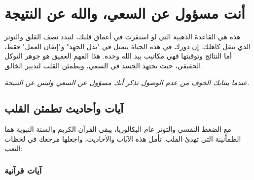 \documentclass[12pt,a4paper]{book}
\newcommand{\quoteAr}[1]{%
	\begin{myquote}
		\itshape #1
	\end{myquote}
}
\begin{document}
	
	\section{أنت مسؤول عن السعي، والله عن النتيجة}
	
	هذه هي القاعدة الذهبية التي لو استقرت في أعماق قلبك، لتبدد نصف القلق والتوتر الذي يثقل كاهلك. إن دورك في هذه الحياة يتمثل في "بذل الجهد" و"إتقان العمل" فقط، أما النتائج وتوقيتها فهي مكاتيب بيد الله وحده. هذا الفهم العميق هو جوهر التوكل الحقيقي، حيث يجتهد الجسد في السعي، ويطمئن القلب لتدبير الخالق.
	
	\quoteAr{عندما ينتابك الخوف من عدم الوصول تذكر أنك مسؤول عن السعي وليس عن النتيجة.}
	
	
	\subsection*{آيات وأحاديث تطمئن القلب}
	\label{subsec:verses-hadith}
	
	مع الضغط النفسي والتوتر عام البكالوريا، يبقى القرآن الكريم والسنة النبوية هما الطمأنينة التي تهدئ القلب. تأمل هذه الآيات والأحاديث، واجعلها مرجعك في لحظات التعب:
	
	\subsubsection*{آيات قرآنية}
	
\end{document}
